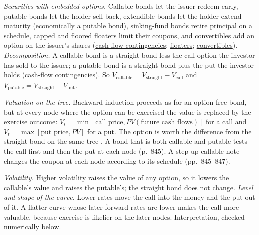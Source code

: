 \begin{qfmethod}\label{meth:callable-putable-bond-valuation}
 \emph{Securities with embedded options.} Callable bonds let the issuer redeem early, putable bonds let the holder sell back, extendible bonds let the holder extend maturity (economically a putable bond), sinking-fund bonds retire principal on a schedule, capped and floored floaters limit their coupons, and convertibles add an option on the issuer's shares (\hyperref[def:bond-cash-flow-contingencies]{cash-flow contingencies}; \hyperref[meth:capped-floored-floater-valuation]{floaters}; \hyperref[meth:convertible-bond-valuation]{convertibles}). \emph{Decomposition.} A callable bond is a straight bond less the call option the investor has sold to the issuer; a putable bond is a straight bond plus the put the investor holds (\hyperref[def:bond-cash-flow-contingencies]{cash-flow contingencies}). So $V_{\text{callable}}=V_{\text{straight}}-V_{\text{call}}$ and $V_{\text{putable}}=V_{\text{straight}}+V_{\text{put}}$.

\emph{Valuation on the tree.} Backward induction proceeds as for an option-free bond, but at every node where the option can be exercised the value is replaced by the exercise outcome: $V_t=\min[\text{call price},PV(\text{future cash flows})]$ for a call and $V_t=\max[\text{put price},PV]$ for a put. The option is worth the difference from the straight bond on the same tree \citep[chap.~36, pp.~840--845]{s7-fabozzifixed}. A bond that is both callable and putable tests the call first and then the put at each node (p.~845). A step-up callable note changes the coupon at each node according to its schedule (pp.~845--847).

\emph{Volatility.} Higher volatility raises the value of any option, so it lowers the callable's value and raises the putable's; the straight bond does not change. \emph{Level and shape of the curve.} Lower rates move the call into the money and the put out of it. A flatter curve whose later forward rates are lower makes the call more valuable, because exercise is likelier on the later nodes. Interpretation, checked numerically below.


\end{qfmethod}
